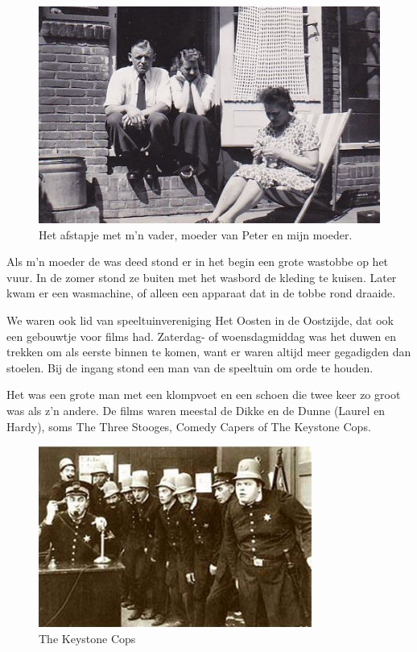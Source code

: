 \documentclass[12pt,twoside, openright]{memoir}
\begin{document}
\begin{figure}
\centering
\includegraphics[width=\textwidth]{img/ch5/gevonden_0009}
\caption*{\footnotesize Het afstapje met m’n vader, moeder van Peter en mijn moeder.}
\end{figure}

Als m’n moeder de was deed stond er in het begin een grote wastobbe op het vuur. In de zomer stond ze buiten met het wasbord de kleding te kuisen. Later kwam er een wasmachine, of alleen een apparaat dat in de tobbe rond draaide. 

We waren ook lid van speeltuinvereniging Het Oosten in de Oostzijde, dat ook een gebouwtje voor films had. Zaterdag- of woensdagmiddag was het duwen en trekken om als eerste binnen te komen, want er waren altijd meer gegadigden dan stoelen. Bij de ingang stond een man van de speeltuin om orde te houden. 

Het was een grote man met een klompvoet en een schoen die twee keer zo groot was als z’n andere. De films waren meestal de Dikke en de Dunne (Laurel en Hardy), soms The Three Stooges, Comedy Capers of The Keystone Cops. 

\begin{figure}
\centering
\includegraphics[width=0.8\textwidth]{img/ch5/ComedyCapers}
\caption*{\footnotesize The Keystone Cops}
\end{figure}
\end{document}
